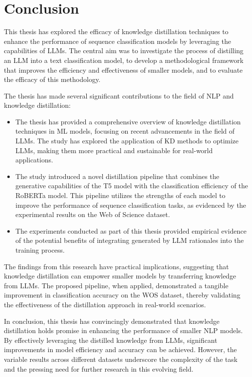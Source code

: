 \chapter{Conclusion}
\label{chap:conclusion}

This thesis has explored the efficacy of knowledge distillation techniques to enhance the performance of sequence classification models by leveraging the capabilities of LLMs. The central aim was to investigate the process of distilling an LLM into a text classification model, to develop a methodological framework that improves the efficiency and effectiveness of smaller models, and to evaluate the efficacy of this methodology.

The thesis has made several significant contributions to the field of NLP and knowledge distillation:
\begin{itemize}
    \item The thesis has provided a comprehensive overview of knowledge distillation techniques in ML models, focusing on recent advancements in the field of LLMs. The study has explored the application of KD methods to optimize LLMs, making them more practical and sustainable for real-world applications.
    \item The study introduced a novel distillation pipeline that combines the generative capabilities of the T5 model with the classification efficiency of the RoBERTa model. This pipeline utilizes the strengths of each model to improve the performance of sequence classification tasks, as evidenced by the experimental results on the Web of Science dataset.
    \item The experiments conducted as part of this thesis provided empirical evidence of the potential benefits of integrating generated by LLM rationales into the training process.
\end{itemize}

The findings from this research have practical implications, suggesting that knowledge distillation can empower smaller models by transferring knowledge from LLMs. The proposed pipeline, when applied, demonstrated a tangible improvement in classification accuracy on the WOS dataset, thereby validating the effectiveness of the distillation approach in real-world scenarios.

In conclusion, this thesis has convincingly demonstrated that knowledge distillation holds promise in enhancing the performance of smaller NLP models. By effectively leveraging the distilled knowledge from LLMs, significant improvements in model efficiency and accuracy can be achieved. However, the variable results across different datasets underscore the complexity of the task and the pressing need for further research in this evolving field.